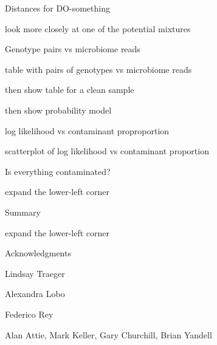 \documentclass[aspectratio=169,12pt,t]{beamer}
\begin{document}
\begin{frame}[c]{Distances for DO-something}

\bbi
 \item look more closely at one of the potential mixtures
\ei

\note{}

\end{frame}




\begin{frame}[c]{Genotype pairs vs microbiome reads}

\bbi
 \item table with pairs of genotypes vs microbiome reads
 \item then show table for a clean sample
 \item then show probability model
\ei

\note{}

\end{frame}



\begin{frame}[c]{log likelihood vs contaminant proproportion}

\bbi
 \item scatterplot of log likelihood vs contaminant proportion
\ei

\note{}

\end{frame}



\begin{frame}[c]{Is everything contaminated?}

\bbi
 \item expand the lower-left corner
\ei

\note{}

\end{frame}




\begin{frame}[c]{Summary}

\bbi
 \item expand the lower-left corner
\ei

\note{}

\end{frame}




\begin{frame}[c]{Acknowledgments}

\bbi
 \item Lindsay Traeger
 \item Alexandra Lobo
 \item Federico Rey
 \item Alan Attie, Mark Keller, Gary Churchill, Brian Yandell
\ei

\note{}

\end{frame}
\end{document}
